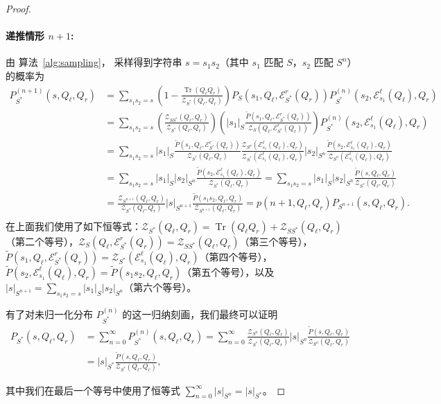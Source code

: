 \documentclass[twoside]{article}
\DeclareMathOperator{\Tr}{Tr}
\newcommand{\EL}{\mc{E}^{\scriptstyle \ell}}
\newcommand{\ER}{\mc{E}^{\scriptstyle r}}
\newcommand{\QL}{Q_{\ell}}
\newcommand{\QR}{Q_{r}}
\newcommand{\Pt}{\tilde{P}}
\newcommand{\mc}[1]{\mathcal{#1}}
\begin{document}
\begin{proof}
\paragraph{\textbf{递推情形} $n + 1$: } 由 算法~\ref{alg:sampling}，
采样得到字符串 $s = s_1 s_2$（其中 $s_1$ 匹配 $S$，$s_2$ 匹配 $S^{n}$）的概率为
%
\begin{align*}
    P_{S^*}^{(n + 1)}\!(s, \QL, \QR) &= \sum_{s_1 s_2 = s} \left(1 - \frac{\Tr(\QL \QR)}{\mc{Z}_{S^*}(\QL, \QR)} \right) P_{S}(s_1, \QL, \ER_{S^*}(\QR)) P_{S^*}^{(n)}(s_2, \EL_{s_1}(\QL), \QR) \\
    &= \sum_{s_1 s_2 = s} \left(\frac{\mc{Z}_{SS^*}(\QL, \QR)}{\mc{Z}_{S^*}(\QL, \QR)} \right) \left(|s_1|_{S} \frac{\Pt(s_1, \QL, \ER_{S^*}(\QR))}{\mc{Z}_S(\QL, \ER_{S^*}(\QR))}\right) P_{S^*}^{(n)}(s_2, \EL_{s_1}(\QL), \QR) \\
    &= \sum_{s_1 s_2 = s} |s_1|_{S} \frac{\Pt(s_1, \QL, \ER_{S^*}(\QR))}{\mc{Z}_{S^*}(\QL, \QR)} \frac{\mc{Z}_{S^n}(\EL_{s_1}(\QL), \QR)}{\mc{Z}_{S^*}(\EL_{s_1}(\QL), \QR)} |s_2|_{S^n} \frac{\Pt(s_2, \EL_{s_1}(\QL), \QR)}{\mc{Z}_{S^n}(\EL_{s_1}(\QL), \QR)} \\
    &= \sum_{s_1 s_2 = s} |s_1|_{S} |s_2|_{S^n} \frac{\Pt(s_2, \EL_{s_1}(\QL), \QR)}{\mc{Z}_{S^*}(\QL, \QR)} = \sum_{s_1 s_2 = s} |s_1|_{S} |s_2|_{S^n} \frac{\Pt(s, \QL, \QR)}{\mc{Z}_{S^*}(\QL, \QR)} \\
    &= \frac{\mc{Z}_{S^{n+1}}(\QL, \QR)}{\mc{Z}_{S^*}(\QL, \QR)} |s|_{S^{n+1}} \frac{\Pt(s_1 s_2, \QL, \QR)}{\mc{Z}_{S^{n+1}}(\QL, \QR)} = p(n+1, \QL, \QR) P_{S^{n+1}}(s, \QL, \QR). \\
\end{align*}
%
在上面我们使用了如下恒等式：$\mc{Z}_{S^*}(\QL, \QR) = \Tr(\QL \QR) + \mc{Z}_{SS^*}(\QL, \QR)$（第二个等号），$\mc{Z}_S(\QL, \ER_{S^*}(\QR)) = \mc{Z}_{SS^*}(\QL, \QR)$（第三个等号），$\Pt(s_1, \QL, \ER_{S^*}(\QR)) = \mc{Z}_{S^*}(\EL_{s_1}(\QL), \QR)$（第四个等号），$\Pt(s_2, \EL_{s_1}(\QL), \QR) = \Pt(s_1 s_2, \QL, \QR)$（第五个等号），以及 $|s|_{S^{n+1}} = \sum_{s_1 s_2 = s} |s_1|_{S} |s_2|_{S^n}$（第六个等号）。

有了对未归一化分布 $P_{S^*}^{(n)}$ 的这一归纳刻画，我们最终可以证明
%
\begin{align*}
    P_{S^*}(s, \QL, \QR) &= \sum_{n = 0}^\infty P_{S^*}^{(n)}(s, \QL, \QR) = \sum_{n = 0}^\infty \frac{\mc{Z}_{S^{n}}(\QL, \QR)}{\mc{Z}_{S^*}(\QL, \QR)} |s|_{S^{n}} \frac{\Pt(s, \QL, \QR)}{\mc{Z}_{S^{n}}(\QL, \QR)} \\
    &= |s|_{S^*} \frac{\Pt(s, \QL, \QR)}{\mc{Z}_{S^*}(\QL, \QR)},
\end{align*}

其中我们在最后一个等号中使用了恒等式 $\sum_{n = 0}^\infty |s|_{S^{n}} = |s|_{S^*}$。

\end{proof}
\end{document}
